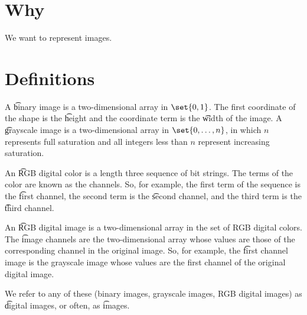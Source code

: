 
\section*{Why}

We want to represent images.

\section*{Definitions}

A \t{binary image} is a two-dimensional array in $\set{0, 1}$.
The first coordinate of the shape is the \t{height} and the coordinate term is the \t{width} of the image.
A \t{grayscale image} is a two-dimensional array in $\set{0, \dots , n}$, in which $n$ represents full saturation and all integers less than $n$ represent increasing saturation.

An \t{RGB digital color} is a length three sequence of bit strings.
The terms of the color are known as the channels.
So, for example, the first term of the sequence is the \t{first channel}, the second term is the \t{second channel}, and the third term is the \t{third channel}.

An \t{RGB digital image} is a two-dimensional array in the set of RGB digital colors.
The \t{image channels} are the two-dimensional array whose values are those of the corresponding channel in the original image.
So, for example, the \t{first channel image} is the grayscale image whose values are the first channel of the original digital image.

We refer to any of these (binary images, grayscale images, RGB digital images) as \t{digital images}, or often, as \t{images}.

\blankpage